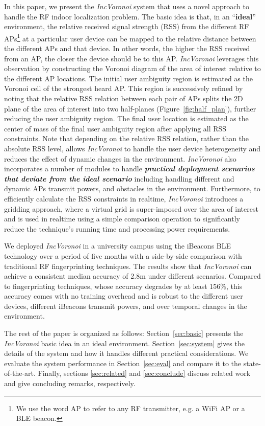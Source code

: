 \documentclass[conference]{IEEEtran}
\def \sys {\textit{IncVoronoi}}
\begin{document}
In this paper, we present the \sys{} system that uses a novel approach to handle the RF indoor localization problem. The basic idea is that, in an ``\textbf{ideal}'' environment, the relative received signal strength (RSS) from the different RF APs\footnote{We use the word AP to refer to any RF transmitter, e.g. a WiFi AP or a
BLE beacon.} at a particular user device can be mapped to the relative distance between the different APs and that device. In other words, the higher the RSS received from an AP, the closer the device should be to this AP. \sys{} leverages this observation by constructing the Voronoi diagram of the area of interest relative to the different AP locations. The initial user ambiguity region is estimated as the Voronoi cell of the strongest heard AP. This region is successively refined by noting that the relative RSS relation between each pair of APs splits the 2D plane of the area of interest into two half-planes (Figure~\ref{fig:half_plan}), further reducing the user ambiguity region. The final user location is estimated as the center of mass of the final user ambiguity  region after applying all RSS constraints. Note that depending on the relative RSS relation, rather than the absolute RSS level, allows \sys{} to handle the user device heterogeneity and reduces the effect of dynamic changes in the environment. \sys{} also incorporates a number of modules to handle \textbf{\emph{practical deployment scenarios that deviate from the ideal scenario}} including handling different and dynamic APs transmit powers, and obstacles in the environment. 
Furthermore, to efficiently calculate the RSS constraints in realtime, \sys{} introduces a gridding approach, where a virtual grid is super-imposed over the area of interest and is used in realtime using a simple comparison operation to significantly reduce the technique's running time and processing power requirements. 

We deployed \sys{} in a university campus using the iBeacons BLE technology over a period of five months with a side-by-side comparison with traditional RF fingerprinting techniques. The results show that \sys{} can achieve a consistent median accuracy of 2.8m under different scenarios. Compared to fingerprinting techniques, whose accuracy degrades by at least 156\%, this accuracy comes with no training overhead and is robust to the different user devices, different iBeacons transmit powers, and over temporal changes in the environment.

The rest of the paper is organized as follows: Section~\ref{sec:basic} presents the \sys{} basic idea in an ideal environment. Section~\ref{sec:system} gives the details of the system and how it handles different practical considerations. We evaluate the system performance in Section~\ref{sec:eval} and compare it to the state-of-the-art. Finally, sections \ref{sec:related} and \ref{sec:conclude} discuss related work and give concluding remarks, respectively.
\end{document}
